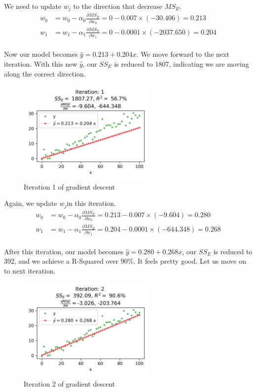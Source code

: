 \documentclass[
	letterpaper
]{article}
\begin{document}
We need to update $w_j$ to the direction that decrease $MS_E$.
\begin{equation}
\begin{split}
w_0 &= w_0 - \alpha_0 \frac{\partial MS_E}{\partial w_0} = 0 - 0.007\times (-30.406) = 0.213\\
w_1 &= w_1 - \alpha_ 1 \frac{\partial MS_E}{\partial w_1} = 0 - 0.0001\times (-2037.650)=0.204 \\
\end{split}
\end{equation}

Now our model becomes $\hat y = 0.213 + 0.204 x$.
We move forward to the next iteration. 
With this new $\hat y$, our $SS_E$ is reduced to 1807, indicating we are moving along the correct direction.
\begin{figure}[htbp]
	\centering
	\includegraphics[width=0.6\textwidth]{figures/visualize-1.png}
	\caption{Iteration 1 of gradient descent}
	\label{fig:vis1}
\end{figure}

Again, we update $w_j$in this iteration.
\begin{equation}
\begin{split}
w_0 &= w_0 - \alpha_0 \frac{\partial MS_E}{\partial w_0} = 0.213 - 0.007\times (-9.604) = 0.280\\
w_1 &= w_1 - \alpha_ 1 \frac{\partial MS_E}{\partial w_1} = 0.204 - 0.0001\times (-644.348)=0.268 \\
\end{split}
\end{equation}

After this iteration, our model becomes $\hat y = 0.280 + 0.268 x$, our $SS_E$ is reduced to 392, and we achieve a R-Squared over 90\%.
It feels pretty good.
Let us move on to next iteration.
\begin{figure}[htbp]
	\centering
	\includegraphics[width=0.6\textwidth]{figures/visualize-2.png}
	\caption{Iteration 2 of gradient descent}
	\label{fig:vis2}
\end{figure}
\end{document}
